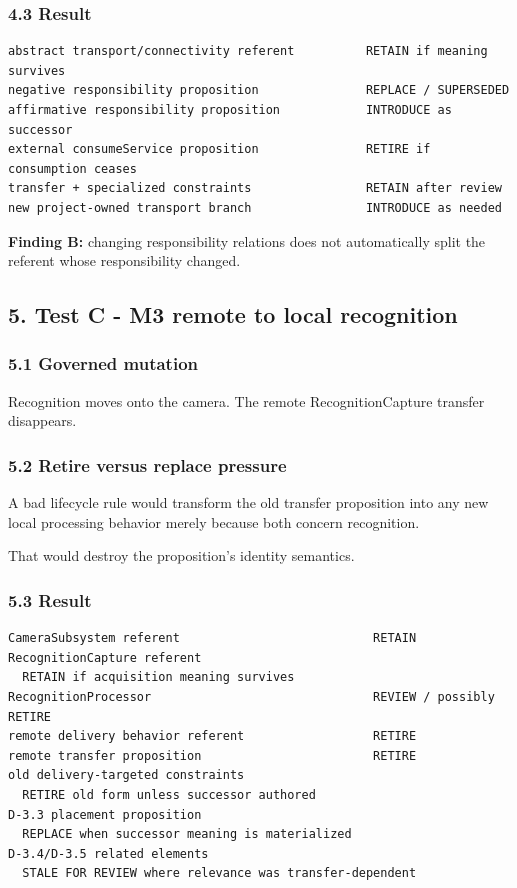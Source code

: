 \documentclass[11pt,a4paper]{article}
\begin{document}
\subsubsection{4.3 Result}\label{result-1}

\begin{verbatim}
abstract transport/connectivity referent          RETAIN if meaning survives
negative responsibility proposition               REPLACE / SUPERSEDED
affirmative responsibility proposition            INTRODUCE as successor
external consumeService proposition               RETIRE if consumption ceases
transfer + specialized constraints                RETAIN after review
new project-owned transport branch                INTRODUCE as needed
\end{verbatim}

\textbf{Finding B:} changing responsibility relations does not
automatically split the referent whose responsibility changed.

\subsection{5. Test C - M3 remote to local
recognition}\label{test-c---m3-remote-to-local-recognition}

\subsubsection{5.1 Governed mutation}\label{governed-mutation-2}

Recognition moves onto the camera. The remote RecognitionCapture
transfer disappears.

\subsubsection{5.2 Retire versus replace
pressure}\label{retire-versus-replace-pressure}

A bad lifecycle rule would transform the old transfer proposition into
any new local processing behavior merely because both concern
recognition.

That would destroy the proposition's identity semantics.

\subsubsection{5.3 Result}\label{result-2}

\begin{verbatim}
CameraSubsystem referent                           RETAIN
RecognitionCapture referent
  RETAIN if acquisition meaning survives
RecognitionProcessor                               REVIEW / possibly RETIRE
remote delivery behavior referent                  RETIRE
remote transfer proposition                        RETIRE
old delivery-targeted constraints
  RETIRE old form unless successor authored
D-3.3 placement proposition
  REPLACE when successor meaning is materialized
D-3.4/D-3.5 related elements
  STALE FOR REVIEW where relevance was transfer-dependent
\end{verbatim}
\end{document}
